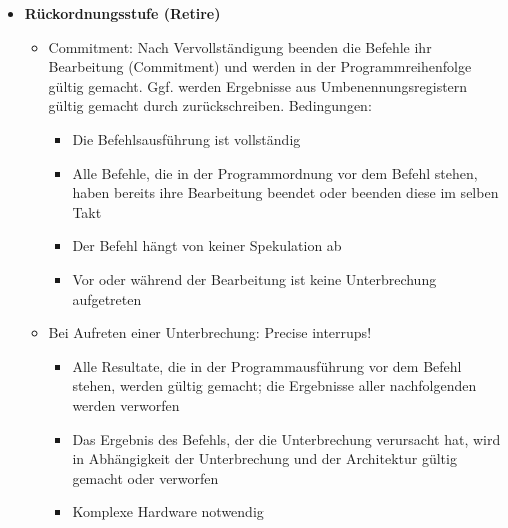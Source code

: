 \begin{itemize}
\begin{itemize}
	\end{itemize}
	\item \textbf{Rückordnungsstufe (Retire)}
	\begin{itemize}
		\item Commitment: Nach Vervollständigung beenden die Befehle ihr Bearbeitung (Commitment) und werden in der Programmreihenfolge gültig gemacht. Ggf. werden Ergebnisse aus Umbenennungsregistern gültig gemacht durch zurückschreiben. Bedingungen:
		\begin{itemize}
			\item Die Befehlsausführung ist vollständig
			\item Alle Befehle, die in der Programmordnung vor dem Befehl stehen, haben bereits ihre Bearbeitung beendet oder beenden diese im selben Takt
			\item Der Befehl hängt von keiner Spekulation ab
			\item Vor oder während der Bearbeitung ist keine Unterbrechung aufgetreten
		\end{itemize}
		\item Bei Aufreten einer Unterbrechung: Precise interrups!
		\begin{itemize}
			\item Alle Resultate, die in der Programmausführung vor dem Befehl stehen, werden gültig gemacht; die Ergebnisse aller nachfolgenden werden verworfen
			\item Das Ergebnis des Befehls, der die Unterbrechung verursacht hat, wird in Abhängigkeit der Unterbrechung und der Architektur gültig gemacht oder verworfen
			\item Komplexe Hardware notwendig
		\end{itemize}
	\end{itemize}
\end{itemize}

